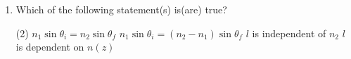 \begin{enumerate}
    \item Which of the following statement(s) is(are) true?
        \begin{tasks}(2)
            \task \(n_1 \sin\theta_i = n_2 \sin\theta_f\)
            \task \(n_1 \sin\theta_i = (n_2 - n_1)\sin\theta_f\)
            \task \(l\) is independent of \(n_2\)
            \task \(l\) is dependent on \(n(z)\)
        \end{tasks}
\end{enumerate}

\begin{center}
\end{center}